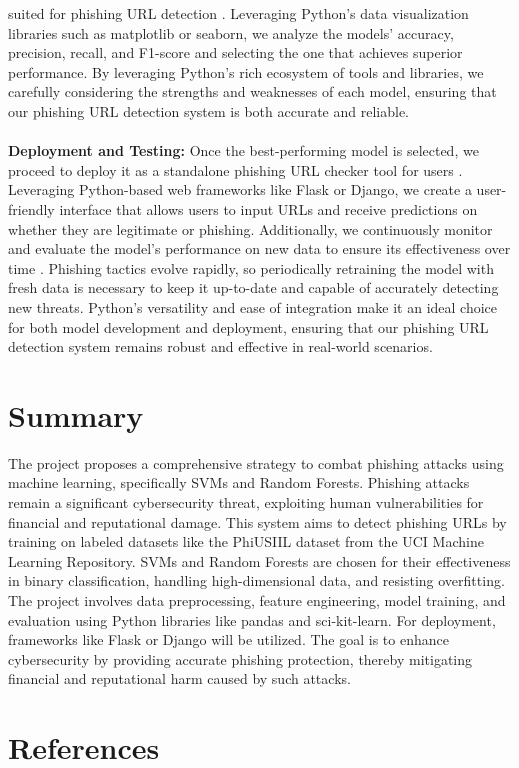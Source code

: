 \documentclass[11pt]{article}
\begin{document}
suited for phishing URL detection \cite{raschka2019python}. Leveraging Python's data visualization libraries such as matplotlib or seaborn, we analyze the models’ accuracy, precision, recall, and F1-score and selecting the one that achieves superior performance. By leveraging Python's rich ecosystem of tools and libraries, we carefully considering the strengths and weaknesses of each model, ensuring that our phishing URL detection system is both accurate and reliable. \\\\ \textbf{Deployment and Testing:} Once the best-performing model is selected, we proceed to deploy it as a standalone phishing URL checker tool for users \cite{gift2020pragmatic}. Leveraging Python-based web frameworks like Flask or Django, we create a user-friendly interface that allows users to input URLs and receive predictions on whether they are legitimate or phishing. Additionally, we continuously monitor and evaluate the model’s performance on new data to ensure its effectiveness over time \cite{hyndman2018forecasting}. Phishing tactics evolve rapidly, so periodically retraining the model with fresh data is necessary to keep it up-to-date and capable of accurately detecting new threats. Python's versatility and ease of integration make it an ideal choice for both model development and deployment, ensuring that our phishing URL detection system remains robust and effective in real-world scenarios.

\section*{Summary}

The project proposes a comprehensive strategy to combat phishing attacks using machine learning, specifically SVMs and Random Forests. Phishing attacks remain a significant cybersecurity threat, exploiting human vulnerabilities for financial and reputational damage. This system aims to detect phishing URLs by training on labeled datasets like the PhiUSIIL dataset from the UCI Machine Learning Repository. SVMs and Random Forests are chosen for their effectiveness in binary classification, handling high-dimensional data, and resisting overfitting. The project involves data preprocessing, feature engineering, model training, and evaluation using Python libraries like pandas and sci-kit-learn. For deployment, frameworks like Flask or Django will be utilized. The goal is to enhance cybersecurity by providing accurate phishing protection, thereby mitigating financial and reputational harm caused by such attacks.

\newpage
\section{References}
\vspace{-29pt}
\renewcommand\refname{} %


\end{document}
